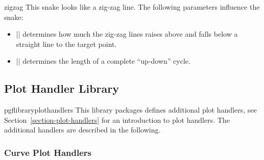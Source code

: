 \begin{snake}{zigzag}
  This snake looks like a zig-zag line. The following parameters
  influence the snake:
  \begin{itemize}
  \item |\pgfsnakesegmentamplitude|
    determines how much the zig-zag lines raises above and falls below
    a straight line to the target point.
  \item |\pgfsnakesegmentlength|
    determines the length of a complete ``up-down'' cycle.
  \end{itemize}
\begin{codeexample}[]
\end{codeexample}
\end{snake}



\subsection{Plot Handler Library}
\label{section-library-plothandlers}

\begin{package}{pgflibraryplothandlers}
  This library packages defines additional plot handlers, see
  Section~\ref{section-plot-handlers} for an introduction to plot
  handlers. The additional handlers are described in the following. 
\end{package}


\subsubsection{Curve Plot Handlers}
  

